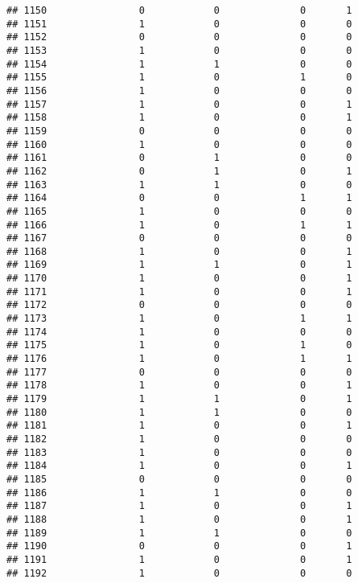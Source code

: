 \documentclass[]{article}
\begin{document}
\begin{verbatim}
## 1150                0            0              0       1
## 1151                1            0              0       0
## 1152                0            0              0       0
## 1153                1            0              0       0
## 1154                1            1              0       0
## 1155                1            0              1       0
## 1156                1            0              0       0
## 1157                1            0              0       1
## 1158                1            0              0       1
## 1159                0            0              0       0
## 1160                1            0              0       0
## 1161                0            1              0       0
## 1162                0            1              0       1
## 1163                1            1              0       0
## 1164                0            0              1       1
## 1165                1            0              0       0
## 1166                1            0              1       1
## 1167                0            0              0       0
## 1168                1            0              0       1
## 1169                1            1              0       1
## 1170                1            0              0       1
## 1171                1            0              0       1
## 1172                0            0              0       0
## 1173                1            0              1       1
## 1174                1            0              0       0
## 1175                1            0              1       0
## 1176                1            0              1       1
## 1177                0            0              0       0
## 1178                1            0              0       1
## 1179                1            1              0       1
## 1180                1            1              0       0
## 1181                1            0              0       1
## 1182                1            0              0       0
## 1183                1            0              0       0
## 1184                1            0              0       1
## 1185                0            0              0       0
## 1186                1            1              0       0
## 1187                1            0              0       1
## 1188                1            0              0       1
## 1189                1            1              0       0
## 1190                0            0              0       1
## 1191                1            0              0       1
## 1192                1            0              0       0

\end{verbatim}
\end{document}
